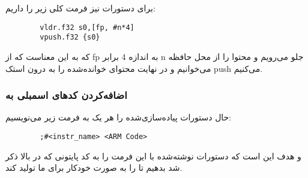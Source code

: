 \begin{itemize}
	برای دستورات
	نیز فرمت کلی زیر را داریم:
	
	\begin{latin}
		\begin{verbatim}
		vldr.f32 s0,[fp, #n*4] 
		vpush.f32 {s0}
		\end{verbatim}
	\end{latin}
	
	که به این معناست که از fp به اندازه 4 برابر n جلو می‌رویم و محتوا را از محل حافظه می‌خوانیم و در نهایت محتوای خوانده‌شده را به درون استک push می‌کنیم.
	
	\subsubsection*{اضافه‌کردن کدهای اسمبلی به 
		}
	
	حال دستورات پیاده‌سازی‌شده را هر یک به فرمت زیر می‌نویسیم:
	
	\begin{latin}
		\begin{verbatim}
		;#<instr_name> <ARM Code>
		\end{verbatim}
	\end{latin}
	
	و هدف این است که دستورات نوشته‌شده با این فرمت را به کد پایتونی که در بالا  ذکر شد بدهیم تا 
	را به صورت خودکار برای ما تولید کند.
\end{itemize}


